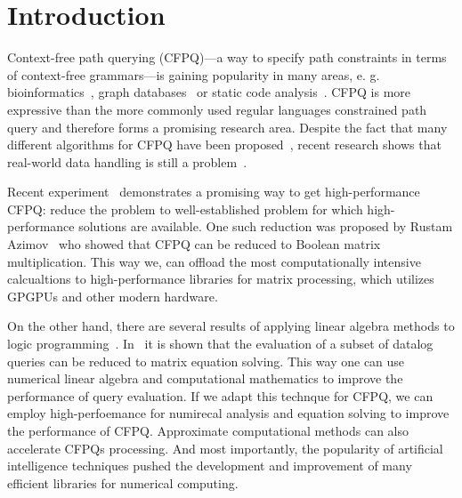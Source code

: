 \documentclass[sigconf]{acmart}
\begin{document}



\maketitle

\section{Introduction}

Context-free path querying (CFPQ)---a way to specify path constraints in terms of context-free grammars---is gaining popularity in many areas, e. g. bioinformatics~\cite{sevon2008subgraph}, graph databases~\cite{yannakakis1990graph,Medeiros:2018:EEC:3167132.3167265,Kuijpers:2019:ESC:3335783.3335791} or static code analysis~\cite{Reps,zhang2013fast}.
CFPQ is more expressive than the more commonly used regular languages constrained path query and therefore forms a promising research area.
Despite the fact that many different algorithms for CFPQ have been proposed~\cite{RDF,Medeiros:2018:EEC:3167132.3167265,azimov2018context,Verbitskaia:2018:PCC:3241653.3241655,10.1007/978-3-319-91662-0_17}, recent research shows that real-world data handling is still a problem~\cite{Kuijpers:2019:ESC:3335783.3335791}.

Recent experiment~\cite{mishin2019evaluation} demonstrates a promising way to get high-performance CFPQ: reduce the problem to well-established problem for which high-performance solutions are available.
One such reduction was proposed by Rustam Azimov~\cite{azimov2018context} who showed that CFPQ can be reduced to Boolean matrix multiplication.
This way we, can offload the most computationally intensive calcualtions to high-performance libraries for matrix processing, which utilizes GPGPUs and other modern hardware.

On the other hand, there are several results of applying linear algebra methods to logic programming~\cite{sato2017linear, aspis2018linear}.
In~\cite{sato2017linear} it is shown that the evaluation of a subset of datalog queries can be reduced to matrix equation solving.
This way one can use numerical linear algebra and computational mathematics to improve the performance of query evaluation.
If we adapt this technque for CFPQ, we can employ high-perfoemance for numirecal analysis and equation solving to improve the performance of CFPQ.
Approximate computational methods can also accelerate CFPQs processing.
And most importantly, the popularity of artificial intelligence techniques pushed the development and improvement of many efficient libraries for numerical computing.
\end{document}
